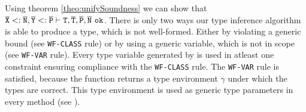 Using theorem \ref{theo:unifySoundness} we can show that $\overline{\tt X} <: \overline{\tt N}, \overline{\tt Y} <: \overline{\tt P} \vdash \texttt{T}, \overline{\tt T}, \overline{\tt P}, \overline{\tt N}\ \texttt{ok}$.
There is only two ways our type inference algorithm is able to produce a type, which is not well-formed.
Either by violating a generic bound (see \texttt{WF-CLASS} rule)
or by using a generic variable, which is not in scope (see \texttt{WF-VAR} rule).
Every type variable generated by \fjtype{} is used in atleast one constraint ensuring compliance with the \texttt{WF-CLASS} rule.
The \texttt{WF-VAR} rule is satisfied, because the \unify{} function returns a type environment $\gamma$ under which the types are correct.
This type environment is used as generic type parameters in every method (see \fjtypeinference{}). 

\fi

